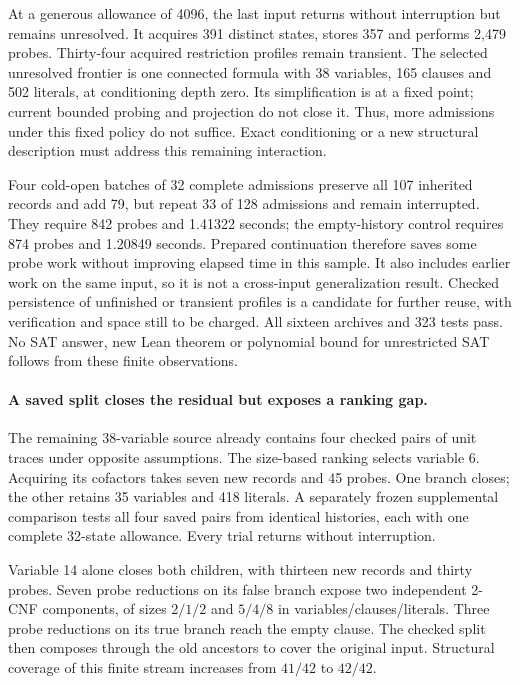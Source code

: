 \documentclass[11pt,a4paper]{article}
\numberwithin{equation}{section}
\theoremstyle{plain}
\theoremstyle{definition}
\theoremstyle{remark}
\begin{document}
At a generous allowance of 4096, the last input returns without interruption
but remains unresolved. It acquires 391 distinct states, stores 357 and performs
2,479 probes. Thirty-four acquired restriction profiles remain transient. The
selected unresolved frontier is one connected formula with 38 variables, 165
clauses and 502 literals, at conditioning depth zero. Its simplification is at a
fixed point; current bounded probing and projection do not close it. Thus, more
admissions under this fixed policy do not suffice. Exact conditioning or a new
structural description must address this remaining interaction.

Four cold-open batches of 32 complete admissions preserve all 107 inherited
records and add 79, but repeat 33 of 128 admissions and remain interrupted.
They require 842 probes and 1.41322 seconds; the empty-history control requires
874 probes and 1.20849 seconds. Prepared continuation therefore saves some probe
work without improving elapsed time in this sample. It also includes earlier
work on the same input, so it is not a cross-input generalization result.
Checked persistence of unfinished or transient profiles is a candidate for
further reuse, with verification and space still to be charged. All sixteen
archives and 323 tests pass. No SAT answer, new Lean theorem or polynomial bound
for unrestricted SAT follows from these finite observations.

\paragraph{A saved split closes the residual but exposes a ranking gap.}
The remaining 38-variable source already contains four checked pairs of unit
traces under opposite assumptions. The size-based ranking selects variable 6.
Acquiring its cofactors takes seven new records and 45 probes. One branch closes;
the other retains 35 variables and 418 literals. A separately frozen supplemental
comparison tests all four saved pairs from identical histories, each with one
complete 32-state allowance. Every trial returns without interruption.

Variable 14 alone closes both children, with thirteen new records and thirty
probes. Seven probe reductions on its false branch expose two independent 2-CNF
components, of sizes $2/1/2$ and $5/4/8$ in variables/clauses/literals. Three probe
reductions on its true branch reach the empty clause. The checked split then
composes through the old ancestors to cover the original input. Structural
coverage of this finite stream increases from $41/42$ to $42/42$.
\end{document}
